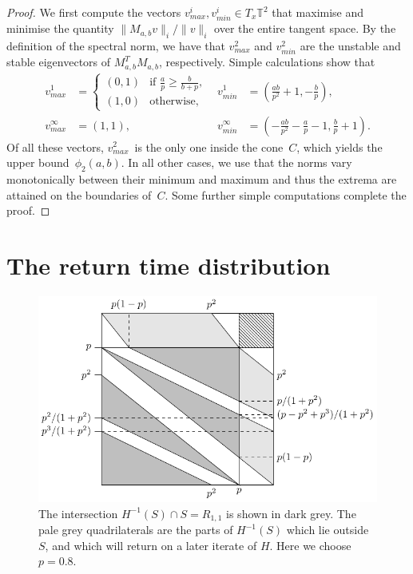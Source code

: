\documentclass{iopart}
\begin{document}
\begin{proof}
  We first compute the vectors $v_{max}^i, v_{min}^i \in T_x \mathbb{T}^2$ that maximise and minimise the quantity $\|M_{a,b}v\|_i/\|v\|_i$ over the entire tangent space. By the definition of the spectral norm, we have that $v_{max}^2$ and $v_{min}^2$ are the unstable and stable eigenvectors 
of $M_{a,b}^T M_{a,b}$, respectively. Simple calculations show that
  \begin{align*}
    v_{max}^1 &= \begin{cases} (0,1) & \text{if } \frac{a}{p} \ge \frac{b}{b+p} , \\ (1,0) & \text{otherwise}, \end{cases} &
    v_{min}^1 &= \left( \frac{ab}{p^2} +1 , -\frac{b}{p} \right), \\
    v_{max}^\infty &= (1,1), &
    v_{min}^\infty &= \left( -\frac{ab}{p^2} -\frac{a}{p} -1 , \frac{b}{p} +1 \right).
  \end{align*}
  Of all these vectors, $v_{max}^2$~is the only one inside the cone~$C$, which yields the upper bound~$\phi_2(a,b)$. In all other cases, we use that the norms vary monotonically between their minimum and maximum and thus the extrema are attained on the boundaries of~$C$. Some further simple computations complete the proof.
\end{proof}






\section{The return time distribution}
\label{sec:return}


\begin{figure}[t!]
	\centering
	\small
\includegraphics{H-1S}
	\caption{The intersection $H^{-1}(S) \cap S = R_{1,1}$ is shown in dark grey. The pale grey quadrilaterals are the parts of $H^{-1}(S)$ which lie outside $S$, and which will return on a later iterate of $H$. Here we choose $p=0.8$.}
	\label{fig:H-1S}
\end{figure}
\end{document}
